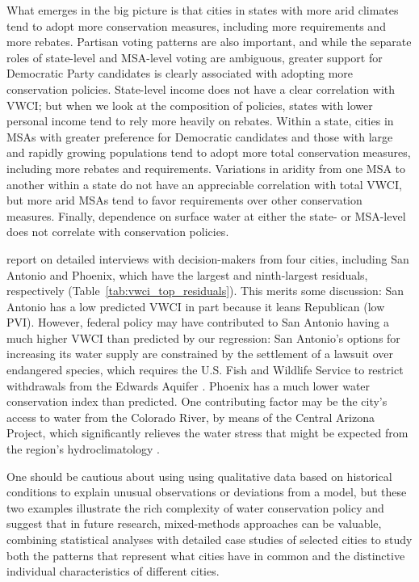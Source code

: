 \documentclass[draft,linenumbers]{agujournal}\usepackage{knitr}
\begin{document}
What emerges in the big picture is that cities in states with
more arid climates tend to adopt more
conservation measures, including more requirements and more rebates.
Partisan voting patterns are also important, and while the separate roles
of state-level and MSA-level voting are ambiguous, greater support for
Democratic Party candidates is clearly associated with adopting more conservation policies.
State-level income does not have a clear correlation with VWCI;
but when we look at the composition of policies, states with lower personal
income tend to rely more heavily on rebates.
Within a state, cities in MSAs with greater
preference for Democratic candidates
and those
with large and rapidly growing populations tend to adopt more total conservation
measures, including more rebates and requirements.
Variations in aridity from one MSA to another within a state do not have an appreciable
correlation with total VWCI, but more arid MSAs tend to favor requirements over other
conservation measures.
Finally, dependence on surface water at either the state- or MSA-level
does not correlate with conservation policies.

\citet{brown:politics:2016} report on detailed interviews with decision-makers
from four cities, including San Antonio and Phoenix, which have the largest
and ninth-largest residuals, respectively
(Table~\ref{tab:vwci_top_residuals}).
This merits some discussion:
San Antonio has a low predicted VWCI in part because
it leans Republican (low PVI).
However, federal policy may have
contributed to San Antonio having a much higher VWCI than predicted by our
regression: San Antonio's options for increasing its water supply are
constrained by the settlement of a lawsuit over endangered species, which
requires the U.S. Fish and Wildlife Service to restrict withdrawals from the
Edwards Aquifer \citep{brown:politics:2016}.
Phoenix has a much lower water conservation index than predicted.
One contributing factor may be the city's access to water from the Colorado River,
by means of the Central Arizona Project, which significantly relieves the
water stress that might be expected from the region's hydroclimatology
\citep{brown:politics:2016}.

One should be cautious about using using qualitative data based on historical
conditions to explain unusual observations or deviations from a model,
but these two examples illustrate the rich complexity of water conservation
policy and suggest that in future research, mixed-methods approaches
can be valuable, combining statistical analyses with detailed case studies
of selected cities to study both the patterns that represent what cities
have in common and the distinctive individual characteristics of different cities.
\end{document}
